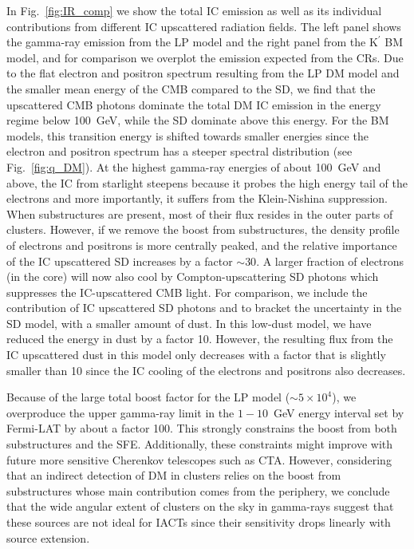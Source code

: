 \documentclass[10pt,aps,pra,reprint,amsmath,amsfonts,amssymb,showpacs,nofootinbib,floatfix]{revtex4-1}
\newcommand{\rmn}{\mathrm}
\newcommand{\Kp}{\rmn{K}^\prime}
\begin{document}
In Fig.~\ref{fig:IR_comp} we show the total IC emission as well as its
individual contributions from different IC upscattered radiation
fields. The left panel shows the gamma-ray emission from the LP model
and the right panel from the $\Kp$ BM model, and for comparison we
overplot the emission expected from the CRs. Due to the flat electron
and positron spectrum resulting from the LP DM model and the smaller
mean energy of the CMB compared to the SD, we find that the
upscattered CMB photons dominate the total DM IC emission in the
energy regime below 100~GeV, while the SD dominate above this
energy. For the BM models, this transition energy is shifted towards
smaller energies since the electron and positron spectrum has a
steeper spectral distribution (see Fig.~\ref{fig:q_DM}). At the
highest gamma-ray energies of about 100~GeV and above, the IC from
starlight steepens because it probes the high energy tail of the
electrons and more importantly, it suffers from the Klein-Nishina
suppression. When substructures are present, most of their flux
resides in the outer parts of clusters. However, if we remove the
boost from substructures, the density profile of electrons and
positrons is more centrally peaked, and the relative importance of the
IC upscattered SD increases by a factor $\sim 30$.  A larger fraction
of electrons (in the core) will now also cool by Compton-upscattering
SD photons which suppresses the IC-upscattered CMB light.  For
comparison, we include the contribution of IC upscattered SD photons
and to bracket the uncertainty in the SD model, with a smaller amount
of dust. In this low-dust model, we have reduced the energy in dust by
a factor 10. However, the resulting flux from the IC upscattered dust
in this model only decreases with a factor that is slightly smaller
than 10 since the IC cooling of the electrons and positrons also
decreases.

Because of the large total boost factor for the LP model ($\sim5\times
10^4$), we overproduce the upper gamma-ray limit in the $1-10$~GeV
energy interval set by Fermi-LAT by about a factor 100. This strongly
constrains the boost from both substructures and the
SFE. Additionally, these constraints might improve with future more
sensitive Cherenkov telescopes such as CTA. However, considering that
an indirect detection of DM in clusters relies on the boost from
substructures whose main contribution comes from the periphery, we
conclude that the wide angular extent of clusters on the sky in
gamma-rays suggest that these sources are not ideal for IACTs since
their sensitivity drops linearly with source extension.
\end{document}
